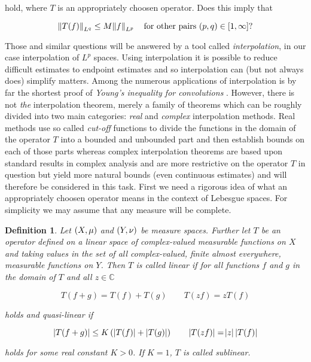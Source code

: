 \documentclass[11pt,oneside,a4paper,final]{amsart}
\theoremstyle{bold}
\newtheorem{definition}{Definition}[section]
\begin{document}
hold, where $T$ is an appropriately choosen operator. Does this imply that

\begin{equation*}
    \norm[0]{T(f)}_{L^q} \leq M \norm{f}_{L^p} \quad \text{for other pairs $\del{p,q} \in \intcc{1,\infty}$?}
\end{equation*}

Those and similar questions will be answered by a tool called \emph{interpolation}, in our case interpolation of $L^p$ spaces. Using interpolation it is possible to reduce difficult estimates to endpoint estimates and so interpolation can (but not always does) simplify matters. Among the numerous applications of interpolation is by far the shortest proof of \emph{Young's inequality for convolutions} \textup{\cite[22--23]{grafakos:fourier:2014}}. However, there is not \emph{the} interpolation theorem, merely a family of theorems which can be
roughly divided into two main categories: \emph{real} and \emph{complex} interpolation methods. Real methods use so called \emph{cut-off} functions to divide the functions in the domain of the operator $T$ into a bounded and unbounded part and then establish bounds on each of those parts whereas complex interpolation theorems are based upon standard results in complex analysis and are more restrictive on the operator $T$ in question but yield more natural bounds (even continuous estimates) and will therefore be considered in this task. First we need a rigorous idea of what an appropriately choosen operator means in the context of Lebesgue spaces. For simplicity we may assume that any measure will be complete.

\begin{mdframed}
    \begin{definition}
        Let $\del{X,\mu}$ and $\del{Y,\nu}$ be measure spaces. Further let $T$ be an operator defined on a linear space of complex-valued measurable functions on $X$ and taking values in the set of all complex-valued, finite almost everywhere, measurable functions on $Y$. Then $T$ is called \emph{linear} if for all functions $f$ and $g$ in the domain of $T$ and all $z \in \mathbb{C}$

        \begin{equation}
            T(f + g) = T(f) + T(g) \qquad T(zf) = zT(f)
            \label{eq:linear}
        \end{equation}

        \noindent holds and \emph{quasi-linear} if

        \begin{equation}
            \abs[0]{T(f + g)} \leq K \del[0]{\abs[0]{ T(f)} + \abs[0]{ T(g)}} \qquad \abs[0]{ T(zf) } = \abs{z}\abs[0]{ T(f)}
            \label{eq:quasilinear}
        \end{equation}

        \noindent holds for some real constant $K > 0$. If $K = 1$, $T$ is called \emph{sublinear}.
    \end{definition}
\end{mdframed}
\end{document}
